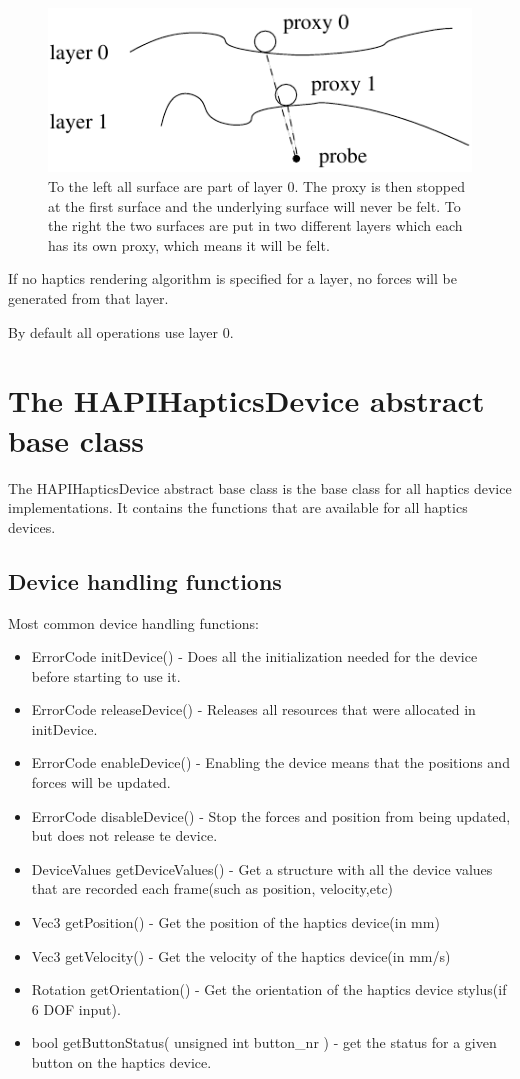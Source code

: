 \begin{figure} 
  \centering 
  \includegraphics{images/layering.pdf}
  \caption{To the left all surface are part of layer 0. The proxy is then stopped at the first surface and the
underlying surface will never be felt. To the right the two surfaces are put in two different layers which
each has its own proxy, which means it will be felt.} 
  \label{Layering_fig} 
\end{figure}

If no haptics rendering algorithm is specified for a layer, no forces
will be generated from that layer.
 
By default all operations use layer 0.

\section{The HAPIHapticsDevice abstract base class}
The HAPIHapticsDevice abstract base class is the base class for all
haptics device implementations. It contains the functions that are
available for all haptics devices.  

\subsection{Device handling functions}

Most common device handling functions:

\begin{itemize}
\item ErrorCode initDevice() -  Does all the initialization needed for the
device before starting to use it.
\item ErrorCode releaseDevice() - Releases all resources that were allocated
in initDevice.
\item ErrorCode enableDevice() - Enabling the device means that the
positions and forces will be updated.  
\item ErrorCode disableDevice() - Stop the forces and position
from being updated, but does not release te device.
\item DeviceValues getDeviceValues() - Get a structure with all the
  device values that are recorded each frame(such as position,
  velocity,etc)
\item Vec3 getPosition() - Get the position of the haptics device(in
  mm)
\item Vec3 getVelocity() - Get the velocity of the haptics device(in
  mm/s)
\item Rotation getOrientation() - Get the orientation of the haptics
  device stylus(if 6 DOF input).
\item bool getButtonStatus( unsigned int button\_nr ) - get the status
  for a given button on the haptics device.
\end{itemize}

